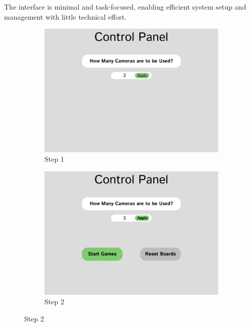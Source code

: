 The interface is minimal and task-focused, enabling efficient system setup and management with little technical effort. \\

\newpage

\begin{figure}[h!]
    \centering
    \begin{subfigure}[h!]{0.40\linewidth}
        \centering
        \includegraphics[width=\linewidth]{figures/methods/wireframes/control-panel-1.png}
        \caption{Step 1}
        \label{fig:control-panel-1}
    \end{subfigure}
    \hfill
    \begin{subfigure}[h!]{0.40\linewidth}
        \centering
        \includegraphics[width=\linewidth]{figures/methods/wireframes/control-panel-2.png}
        \caption{Step 2}
        \label{fig:control-panel-2}
    \end{subfigure}


\end{figure}
